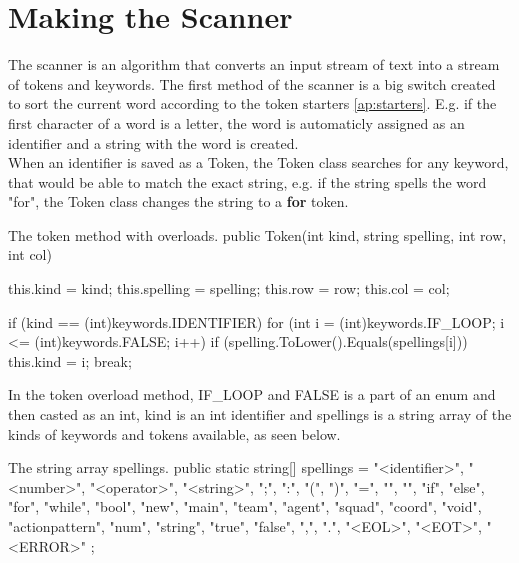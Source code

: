 \section{Making the Scanner}
The scanner is an algorithm that converts an input stream of text into a stream of tokens and keywords. The first method of the scanner is a big switch created to sort the current word according to the token starters \ref{ap:starters}. E.g. if the first character of a word is a letter, the word is automaticly assigned as an identifier and a string with the word is created.\\
When an identifier is saved as a Token, the Token class searches for any keyword, that would be able to match the exact string, e.g. if the string spells the word "for", the Token class changes the string to a \textbf{for} token.\\

\begin{source}{}{The token method with overloads.}{}
public Token(int kind, string spelling, int row, int col)
        {
            this.kind = kind;
            this.spelling = spelling;
            this.row = row;
            this.col = col;

            if (kind == (int)keywords.IDENTIFIER)
            {
                for (int i = (int)keywords.IF_LOOP; i <= (int)keywords.FALSE; i++)
                {
                    if (spelling.ToLower().Equals(spellings[i]))
                    {
                        this.kind = i;
                        break;
                    }
                }
            }
        }
\end{source}
In the token overload method, IF\_LOOP and FALSE is a part of an enum and then casted as an int, kind is an int identifier and spellings is a string array of the kinds of keywords and tokens available, as seen below.

\begin{source}{}{The string array spellings.}{}
public static string[] spellings = 
        {
            "<identifier>", "<number>", "<operator>", "<string>", ";", ":", "(", ")", "=", "{", "}", 
            "if", "else", "for", "while", "bool", "new", "main", "team", "agent", "squad", "coord", "void", 
            "actionpattern", "num", "string", "true", "false", ",", ".", "<EOL>", "<EOT>", "<ERROR>"                         
        };
\end{source}


